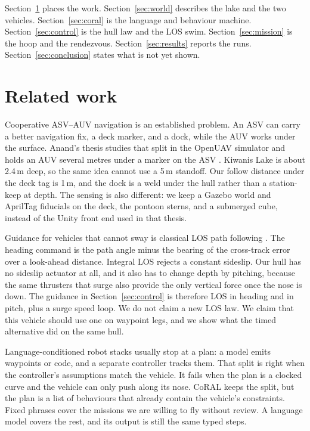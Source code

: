 \documentclass[conference]{IEEEtran}
\def\CoRAL{CoRAL}
\begin{document}
Section~\ref{sec:related} places the work. Section~\ref{sec:world} describes the lake and the two vehicles. Section~\ref{sec:coral} is the language and behaviour machine. Section~\ref{sec:control} is the hull law and the LOS swim. Section~\ref{sec:mission} is the hoop and the rendezvous. Section~\ref{sec:results} reports the runs. Section~\ref{sec:conclusion} states what is not yet shown.

\section{Related work}
\label{sec:related}

Cooperative ASV--AUV navigation is an established problem. An ASV can carry a better navigation fix, a deck marker, and a dock, while the AUV works under the surface. Anand's thesis studies that split in the OpenUAV simulator and holds an AUV several metres under a marker on the ASV \cite{anand2020}. Kiwanis Lake is about 2.4\,m deep, so the same idea cannot use a 5\,m standoff. Our follow distance under the deck tag is 1\,m, and the dock is a weld under the hull rather than a station-keep at depth. The sensing is also different: we keep a Gazebo world and AprilTag fiducials \cite{olson2011} on the deck, the pontoon sterns, and a submerged cube, instead of the Unity front end used in that thesis.

Guidance for vehicles that cannot sway is classical LOS path following \cite{fossen2011,lekkas2014}. The heading command is the path angle minus the bearing of the cross-track error over a look-ahead distance. Integral LOS rejects a constant sideslip. Our hull has no sideslip actuator at all, and it also has to change depth by pitching, because the same thrusters that surge also provide the only vertical force once the nose is down. The guidance in Section~\ref{sec:control} is therefore LOS in heading and in pitch, plus a surge speed loop. We do not claim a new LOS law. We claim that this vehicle should use one on waypoint legs, and we show what the timed alternative did on the same hull.

Language-conditioned robot stacks usually stop at a plan: a model emits waypoints or code, and a separate controller tracks them. That split is right when the controller's assumptions match the vehicle. It fails when the plan is a clocked curve and the vehicle can only push along its nose. \CoRAL{} keeps the split, but the plan is a list of behaviours that already contain the vehicle's constraints. Fixed phrases cover the missions we are willing to fly without review. A language model covers the rest, and its output is still the same typed steps.
\end{document}
